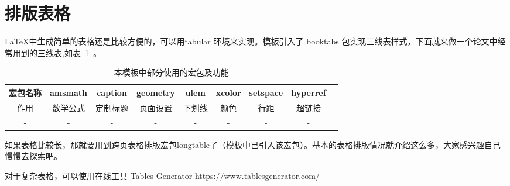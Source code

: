 \section{排版表格}

\LaTeX 中生成简单的表格还是比较方便的，可以用tabular 环境来实现。模板引入了 booktabs 包实现三线表样式，下面就来做一个论文中经常用到的三线表,如表~\ref{table_1}~。

\begin{table}[htbp!]
    \centering
    \caption{本模板中部分使用的宏包及功能}
    \label{table_1}
    \begin{tabular}{ccccccccc}
        \toprule
        宏包名称 & amsmath  & caption  & geometry & ulem   & xcolor & setspace & hyperref \\
        \midrule
        作用     & 数学公式 & 定制标题 & 页面设置 & 下划线 & 颜色   & 行距     & 超链接   \\
        -        & -        & -        & -        & -      & -      & -        & -        \\
        \bottomrule
    \end{tabular}
\end{table}

如果表格比较长，那就要用到跨页表格排版宏包longtable了（模板中已引入该宏包）。基本的表格排版情况就介绍这么多，大家感兴趣自己慢慢去探索吧。

对于复杂表格，可以使用在线工具 Tables Generator \url{https://www.tablesgenerator.com/}
